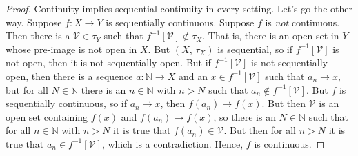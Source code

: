 \documentclass{article}
\theoremstyle{plain}
\theoremstyle{normal}
\begin{document}
        \begin{proof}
            Continuity implies sequential continuity in every setting.
            Let's go the other way. Suppose $f:X\rightarrow{Y}$ is
            sequentially continuous. Suppose $f$ is \textit{not} continuous.
            Then there is a $\mathcal{V}\in\tau_{Y}$ such that
            $f^{-1}[\mathcal{V}]\notin\tau_{X}$. That is, there is an open
            set in $Y$ whose pre-image is not open in $X$. But
            $(X,\,\tau_{X})$ is sequential, so if $f^{-1}[\mathcal{V}]$ is not
            open, then it is not sequentially open. But if
            $f^{-1}[\mathcal{V}]$ is not sequentially open, then
            there is a sequence $a:\mathbb{N}\rightarrow{X}$ and an
            $x\in{f}^{-1}[\mathcal{V}]$ such that
            $a_{n}\rightarrow{x}$, but for all $N\in\mathbb{N}$ there is an
            $n\in\mathbb{N}$ with $n>N$ such that
            $a_{n}\notin{f}^{-1}[\mathcal{V}]$. But $f$ is sequentially
            continuous, so if $a_{n}\rightarrow{x}$, then
            $f(a_{n})\rightarrow{f}(x)$. But then $\mathcal{V}$ is an open set
            containing $f(x)$ and $f(a_{n})\rightarrow{f}(x)$, so there is an
            $N\in\mathbb{N}$ such that for all $n\in\mathbb{N}$ with $n>N$
            it is true that $f(a_{n})\in\mathcal{V}$. But then for all
            $n>N$ it is true that $a_{n}\in{f}^{-1}[\mathcal{V}]$, which is
            a contradiction. Hence, $f$ is continuous.
        \end{proof}
\end{document}
